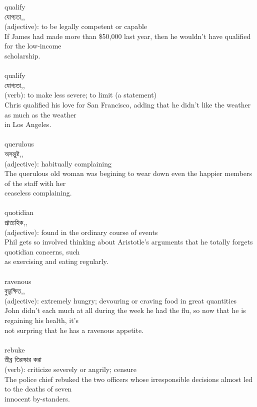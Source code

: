 \documentclass{article}
\begin{document}
{qualify}\\
{যোগ্যতা,,}\\
{(adjective): to be legally competent or capable\\If James had made more than \$50,000 last year, then he wouldn't have qualified for the low-income\\scholarship.\\}\\
{qualify}\\
{যোগ্যতা,,}\\
{(verb): to make less severe; to limit (a statement)\\Chris qualified his love for San Francisco, adding that he didn't like the weather as much as the weather\\in Los Angeles.\\}\\
{querulous}\\
{অসন্তুষ্ট,,}\\
{(adjective): habitually complaining\\The querulous old woman was begining to wear down even the happier members of the staff with her\\ceaseless complaining.\\}\\
{quotidian}\\
{প্রাত্যহিক,,}\\
{(adjective): found in the ordinary course of events\\Phil gets so involved thinking about Aristotle's arguments that he totally forgets quotidian concerns, such\\as exercising and eating regularly.\\}\\
{ravenous}\\
{বুভুক্ষিত,,}\\
{(adjective): extremely hungry; devouring or craving food in great quantities\\John didn't each much at all during the week he had the flu, so now that he is regaining his health, it's\\not surpring that he has a ravenous appetite.\\}\\
{rebuke}\\
{তীব্র তিরস্কার করা}\\
{(verb): criticize severely or angrily; censure\\The police chief rebuked the two officers whose irresponsible decisions almost led to the deaths of seven\\innocent by-standers.\\}\\
\end{document}
